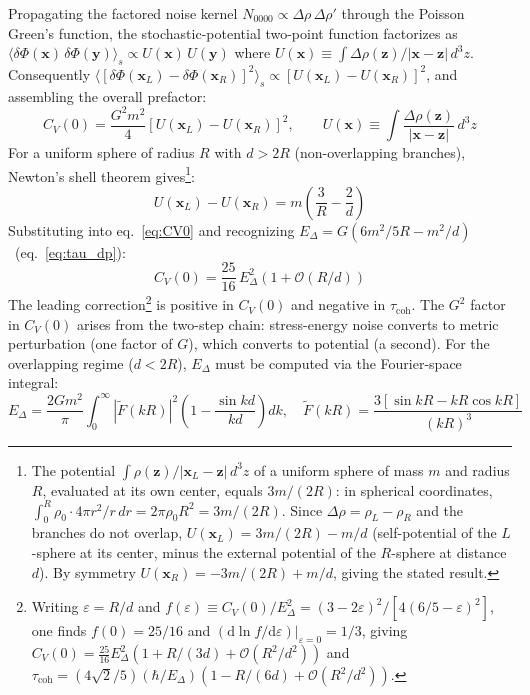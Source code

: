 \documentclass[12pt,a4paper]{article}
\theoremstyle{remark}
\begin{document}
Propagating the factored noise kernel $N_{0000}\propto\Delta\rho\,\Delta\rho'$
through the Poisson Green's function, the stochastic-potential two-point function
factorizes as $\langle\delta\Phi(\mathbf{x})\,\delta\Phi(\mathbf{y})\rangle_s \propto U(\mathbf{x})\,U(\mathbf{y})$
where $U(\mathbf{x})\equiv \int\Delta\rho(\mathbf{z})/|\mathbf{x}-\mathbf{z}|\,d^3z$.
Consequently $\langle[\delta\Phi(\mathbf{x}_L)-\delta\Phi(\mathbf{x}_R)]^2\rangle_s
\propto [U(\mathbf{x}_L)-U(\mathbf{x}_R)]^2$, and assembling the overall prefactor:
\begin{equation}
C_V(0) = \frac{G^2 m^2}{4}\!\left[U(\mathbf{x}_L) - U(\mathbf{x}_R)\right]^2, \qquad
U(\mathbf{x}) \equiv \int\frac{\Delta\rho(\mathbf{z})}{|\mathbf{x}-\mathbf{z}|}\,d^3z
\label{eq:CV0}
\end{equation}
For a uniform sphere of radius $R$ with $d > 2R$ (non-overlapping branches), Newton's
shell theorem gives\footnote{The potential
$\int\rho(\mathbf{z})/|\mathbf{x}_L - \mathbf{z}|\,d^3z$ of a uniform sphere of mass $m$
and radius $R$, evaluated at its own center, equals $3m/(2R)$: in spherical coordinates,
$\int_0^R \rho_0 \cdot 4\pi r^2/r\,dr = 2\pi\rho_0 R^2 = 3m/(2R)$.  Since
$\Delta\rho = \rho_L - \rho_R$ and the branches do not overlap,
$U(\mathbf{x}_L) = 3m/(2R) - m/d$ (self-potential of the $L$-sphere at its center, minus
the external potential of the $R$-sphere at distance $d$). By symmetry
$U(\mathbf{x}_R) = -3m/(2R) + m/d$, giving the stated result.}:
\begin{equation}
U(\mathbf{x}_L) - U(\mathbf{x}_R) = m\!\left(\frac{3}{R} - \frac{2}{d}\right)
\end{equation}
Substituting into eq.~\eqref{eq:CV0} and recognizing
$E_\Delta = G(6m^2/5R - m^2/d)$~(eq.~\ref{eq:tau_dp}):
\begin{equation}
C_V(0) = \frac{25}{16}\,E_\Delta^2\left(1 + \mathcal{O}(R/d)\right)
\label{eq:CV0_sphere}
\end{equation}
\noindent
The leading correction\footnote{Writing $\varepsilon = R/d$ and
$f(\varepsilon) \equiv C_V(0)/E_\Delta^2 = (3-2\varepsilon)^2/[4(6/5-\varepsilon)^2]$,
one finds $f(0) = 25/16$ and $(\mathrm{d}\ln f/\mathrm{d}\varepsilon)|_{\varepsilon=0} = 1/3$, giving
$C_V(0) = \tfrac{25}{16}E_\Delta^2(1 + R/(3d) + \mathcal{O}(R^2/d^2))$ and
$\tau_{\text{coh}} = (4\sqrt{2}/5)(\hbar/E_\Delta)(1 - R/(6d) + \mathcal{O}(R^2/d^2))$.}
is positive in $C_V(0)$ and negative in $\tau_{\text{coh}}$.
The $G^2$ factor in $C_V(0)$ arises from the two-step chain: stress-energy noise converts
to metric perturbation (one factor of $G$), which converts to potential (a second). For
the overlapping regime ($d < 2R$), $E_\Delta$ must be computed via the Fourier-space
integral:
\begin{equation}
E_\Delta = \frac{2Gm^2}{\pi}\int_0^\infty|\tilde{F}(kR)|^2\!\left(1-\frac{\sin kd}{kd}\right)dk, \quad
\tilde{F}(kR) = \frac{3[\sin kR - kR\cos kR]}{(kR)^3}
\label{eq:E_delta_fourier}
\end{equation}
\end{document}
